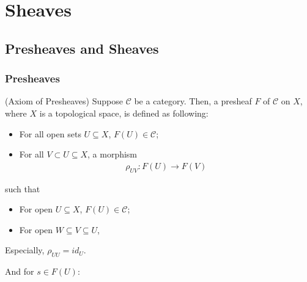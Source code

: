 \documentclass[Total.tex]{subfiles}
\begin{document}
	\chapter{Sheaves}
		\section{Presheaves and Sheaves}
			\subsection{Presheaves}
					\begin{Def} (Axiom of Presheaves)
					Suppose $\mathcal{C}$ be a category. Then, a presheaf $F$ of $\mathcal{C}$ on $X$, where $X$ is a topological space, is defined as following:
					\begin{itemize}
						\item For all open sets $U\subseteq X$, $F(U)\in \mathcal{C}$;
						\item For all $V\subset U\subseteq X$, a morphism
						\begin{gather*}
							\rho_{UV}:F(U)\rightarrow F(V)
						\end{gather*}
					\end{itemize}
					such that
					\begin{itemize}
						\item For open $U\subseteq X$, $F(U)\in \mathcal{C}$;
						\item For open $W\subseteq V\subseteq U$,
						\begin{center}
						\end{center}
					\end{itemize}
					
					Especially, $\rho_{UU}=id_U$.
				\end{Def}
				And for $s\in F(U)$:
\end{document}
